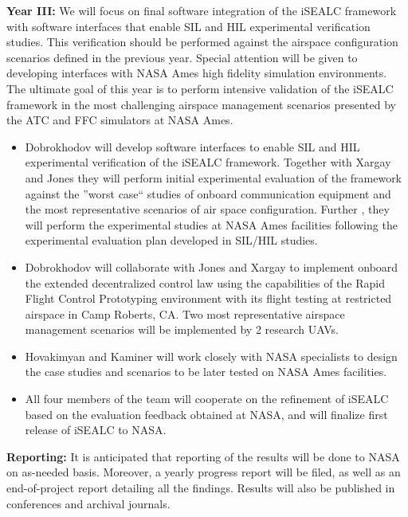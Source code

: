 \documentclass[letter,onecolumn,12pt]{aiaa-tc}
\newcommand{\1}{1_n}
\begin{document}
\textbf{Year III:} We will focus on final software integration of the iSEALC framework with software interfaces that
enable SIL and HIL experimental verification studies. This verification should be performed against the airspace
configuration scenarios defined in the previous year. Special attention will be given to developing interfaces with
NASA Ames high fidelity simulation environments. The ultimate goal of this year is to perform intensive validation
of the iSEALC framework in the most challenging airspace management scenarios presented by the ATC and FFC simulators
at NASA Ames.
\vspace{-3mm}
\begin{itemize}
\setlength{\itemsep}{-4pt}
    \item Dobrokhodov will develop software interfaces to enable SIL and HIL experimental verification of the iSEALC framework. Together with Xargay and Jones they will perform initial experimental evaluation of the framework against the ''worst case`` studies of onboard communication equipment and the most representative scenarios of air space configuration. Further , they will perform the experimental studies at NASA Ames facilities following the experimental evaluation plan developed in SIL/HIL studies.

    \item Dobrokhodov will collaborate with Jones and Xargay to implement onboard the extended decentralized control law using the capabilities of the Rapid Flight Control Prototyping environment with its flight testing at restricted airspace in Camp Roberts, CA. Two most representative airspace management scenarios will be implemented by 2 research UAVs.

    \item Hovakimyan and Kaminer will work closely with NASA specialists to design the case studies and scenarios to be later tested on NASA Ames facilities.

    \item All four members of the team will cooperate on the refinement of iSEALC based on the evaluation feedback obtained at NASA, and will finalize first release of iSEALC to NASA.
\end{itemize}
\vspace{-2mm}

\textbf{Reporting:} It is anticipated that reporting of the results will be done to NASA on as-needed basis. Moreover, a yearly progress report will be filed, as well as an end-of-project report detailing all the findings. Results will also be published in conferences and archival journals.
\end{document}
